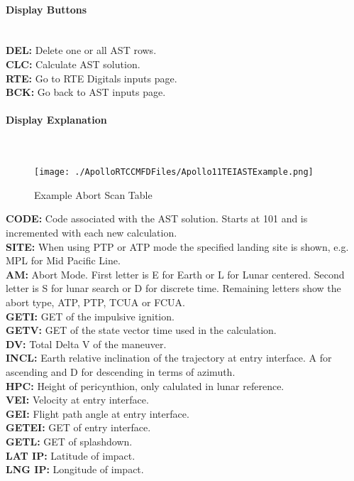 \documentclass[11pt]{article} %
\begin{document}
\paragraph{Display Buttons}\mbox{} \\
\textbf{DEL:} Delete one or all AST rows.\\
\textbf{CLC:} Calculate AST solution.\\
\textbf{RTE:} Go to RTE Digitals inputs page.\\
\textbf{BCK:} Go back to AST inputs page.\\

\paragraph{Display Explanation}\mbox{} \\

\begin{figure}[hp]
	\centering
		\texttt{[image: ./ApolloRTCCMFDFiles/Apollo11TEIASTExample.png]}
	\caption{Example Abort Scan Table}
	\label{fig:Apollo11TEIASTExample}
\end{figure}

\textbf{CODE:} Code associated with the AST solution. Starts at 101 and is incremented with each new calculation.\\
\textbf{SITE:} When using PTP or ATP mode the specified landing site is shown, e.g. MPL for Mid Pacific Line.\\
\textbf{AM:} Abort Mode. First letter is E for Earth or L for Lunar centered. Second letter is S for lunar search or D for discrete time. Remaining letters show the abort type, ATP, PTP, TCUA or FCUA.\\
\textbf{GETI:} GET of the impulsive ignition.\\
\textbf{GETV:} GET of the state vector time used in the calculation.\\
\textbf{DV:} Total Delta V of the maneuver.\\
\textbf{INCL:} Earth relative inclination of the trajectory at entry interface. A for ascending and D for descending in terms of azimuth.\\
\textbf{HPC:} Height of pericynthion, only calulated in lunar reference.\\
\textbf{VEI:} Velocity at entry interface.\\
\textbf{GEI:} Flight path angle at entry interface.\\
\textbf{GETEI:} GET of entry interface.\\
\textbf{GETL:} GET of splashdown.\\
\textbf{LAT IP:} Latitude of impact.\\
\textbf{LNG IP:} Longitude of impact.\\
\end{document}
